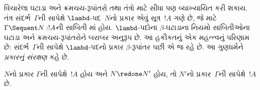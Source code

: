 \label{guunit:OLP-0696}


વિચારેલા ઘટાડા અને ક્રમચય-રૂપાંતરો
 તથા  તંત્રો માટે સીધા પણ વ્યાખ્યાયિત કરી શકાય.
 તંત્ર સંદર્ભ~$\Gamma$ની સાપેક્ષે
$\lambd$-પદ~$N$નો પ્રકાર એવું સૂત્ર~$!A$ ગણે છે,
જે માટે $\Gamma \Sequent N : !A$ની
સાબિતી માં હોય.
$\lambd$-પદોના $\beta$-ઘટાડાના નિયમો
સાબિતીઓના ઘટાડા અને ક્રમચય-રૂપાંતરોને બરાબર અનુરૂપ છે.
આ હકીકતનું એક મહત્ત્વનું પરિણામ છે:
સંદર્ભ~$\Gamma$ની સાપેક્ષે $\lambd$-પદનો પ્રકાર
$\beta$-રૂપાંતર પછી એ જ રહે છે.
આ ગુણધર્મને \emph{પ્રકારનું સંરક્ષણ} કહે છે.

\begin{prop}
$N$નો પ્રકાર $\Gamma$ની સાપેક્ષે~$!A$ હોય
અને $N \redone N'$ હોય,
તો $N'$નો પ્રકાર~$\Gamma$ની સાપેક્ષે~$!A$ છે.
\end{prop}

